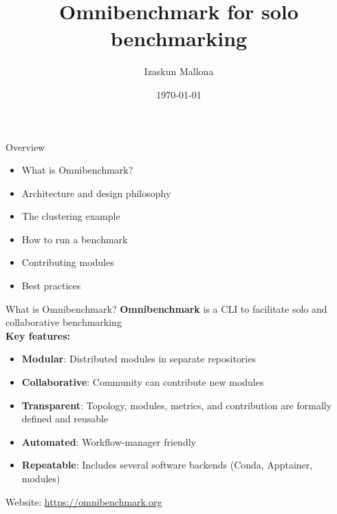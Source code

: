 \documentclass[aspectratio=169]{beamer}
\title{Omnibenchmark for solo benchmarking}
\author{Izaskun Mallona}
\date{\today}
\begin{document}
\frame{\titlepage}

\begin{frame}{Overview}
    \begin{itemize}
        \item What is Omnibenchmark?
        \item Architecture and design philosophy
        \item The clustering example
        \item How to run a benchmark
        \item Contributing modules
        \item Best practices
    \end{itemize}
\end{frame}

\begin{frame}{What is Omnibenchmark?}
  \textbf{Omnibenchmark} is a CLI to facilitate solo and collaborative benchmarking \\

    \textbf{Key features:}
    \begin{itemize}
        \item \textbf{Modular}: Distributed modules in separate repositories
        \item \textbf{Collaborative}: Community can contribute new modules
        \item \textbf{Transparent}: Topology, modules, metrics, and contribution are formally defined and reusable
        \item \textbf{Automated}: Workflow-manager friendly
        \item \textbf{Repeatable}: Includes several software backends (Conda, Apptainer, modules)
    \end{itemize}
    
    \vspace{0.3cm}
    Website: \url{https://omnibenchmark.org}
    
\end{frame}
\end{document}
